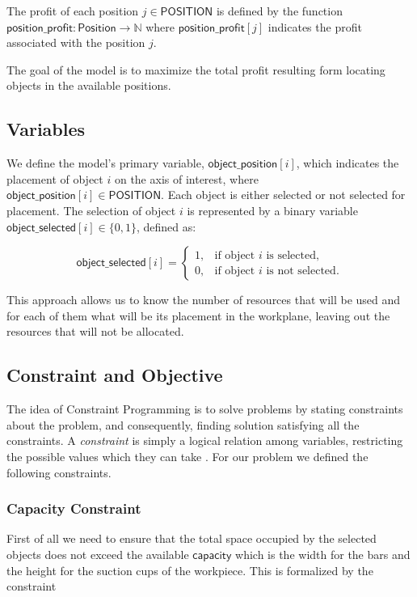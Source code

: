 \documentclass[runningheads]{llncs}
\begin{document}
The profit of each position \(j \in \mathsf{POSITION}\) is defined by the function \\\(\mathsf{position\_profit} \colon \mathsf{Position} \to \mathbb{N}\) where \(\mathsf{position\_profit}[j]\) indicates the profit associated with the position \(j\).

The goal of the model is to maximize the total profit resulting form locating objects in the available positions.

\subsection{Variables}

We define the model's primary variable, \(\mathsf{object\_position}[i]\), which indicates the placement of object \(i\) on the axis of interest, where \(\mathsf{object\_position}[i] \in \mathsf{POSITION}\). Each object is either selected or not selected for placement. The selection of object \(i\) is represented by a binary variable \(\mathsf{object\_selected}[i] \in \{0, 1\}\), defined as:

\[
\mathsf{object\_selected}[i] =
\begin{cases}
	1, & \text{if object } i \text{ is selected}, \\
	0, & \text{if object } i \text{ is not selected}.
\end{cases}
\]

This approach allows us to know the number of resources that will be used and for each of them what will be its placement in the workplane, leaving out the resources that will not be allocated.

\subsection{Constraint and Objective}

The idea of Constraint Programming is to solve problems by stating constraints about the problem, and consequently, finding solution satisfying all the constraints. A \textit{constraint} is simply a logical relation among variables, restricting the possible values which they can take \cite{bartak1999constraint}. For our problem we defined the following constraints.

\subsubsection{Capacity Constraint} First of all we need to ensure that the total space occupied by the selected objects does not exceed the available \(\mathsf{capacity}\) which is the width for the bars and the height for the suction cups of the workpiece. This is formalized by the constraint
\end{document}
